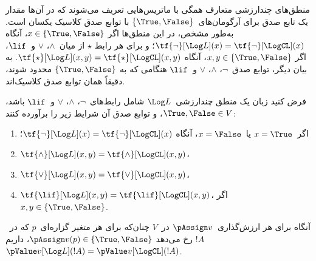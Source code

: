 \documentclass[../../../include/open-logic-section]{subfiles}
\begin{document}


منطق‌های چندارزشی متعارف همگی با ماتریس‌هایی تعریف می‌شوند که در آن‌ها
مقدار یک تابع صدق برای آرگومان‌های~$\{\True, \False\}$ با توابع صدق
کلاسیک یکسان است. به‌طور مشخص، در این منطق‌ها اگر
$x \in \{\True, \False\}$، آنگاه
$\tf{\lnot}[\Log L](x) = \tf{\lnot}[\LogCL](x)$؛ و برای هر رابط
$\star$ از میان~$\land$، $\lor$ و~$\lif$، اگر
$x, y \in \{\True, \False\}$، آنگاه
$\tf{\star}[\Log L](x,y) = \tf{\star}[\LogCL](x,y)$. به بیان دیگر،
توابع صدق~$\lnot$، $\land$، $\lor$ و~$\lif$ هنگامی که به
$\{\True,\False\}$ محدود شوند، دقیقاً همان توابع صدق کلاسیک‌اند.

\begin{prop}
  فرض کنید زبان یک منطق چندارزشی~$\Log L$ شامل رابط‌های~$\lnot$،
  $\land$، $\lor$ و~$\lif$ باشد، $\True, \False \in V$، و توابع صدق
  آن شرایط زیر را برآورده کنند:
  \begin{enumerate}
    \item{} اگر~$x = \True$ یا~$x = \False$، آنگاه
    $\tf{\lnot}[\Log L](x) = \tf{\lnot}[\LogCL](x)$؛
    \item{} $\tf{\land}[\Log L](x,y) = \tf{\land}[\LogCL](x,y)$،
    \item{} $\tf{\lor}[\Log L](x,y) = \tf{\lor}[\LogCL](x,y)$،
    \item{} $\tf{\lif}[\Log L](x,y) = \tf{\lif}[\LogCL](x,y)$،
    اگر~$x, y \in \{\True, \False\}$.
  \end{enumerate}
  آنگاه برای هر ارزش‌گذاری~$\pAssign v$ در~$V$ چنان‌که برای هر متغیر
  گزاره‌ای~$p$ که در~$!A$ رخ می‌دهد
  $\pAssign v(p) \in \{\True,\False\}$، داریم
  $\pValue v[\Log L](!A) = \pValue v[\LogCL](!A)$.
\end{prop}
\end{document}
